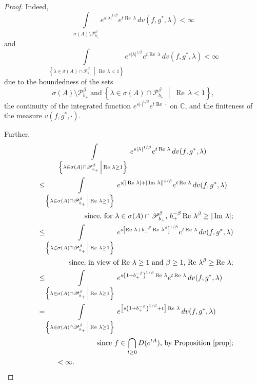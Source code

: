 \documentclass{amsart}
\theoremstyle{plain}
\theoremstyle{definition}
\begin{document}
\begin{proof}
Indeed, 
\[
\int\limits_{\sigma(A)\setminus{\mathscr P}_{b_+}^\beta}e^{s|\lambda|^{1/\beta}}e^{t\operatorname{Re\,}\lambda}\,dv(f,g^*,\lambda)<\infty
\]
and
\[
\int\limits_{\left\{\lambda\in \sigma(A)\cap{\mathscr P}_{b_+}^\beta\,\middle|\,\operatorname{Re\,}\lambda<1 \right\}}e^{s|\lambda|^{1/\beta}}e^{t\operatorname{Re\,}\lambda}\,dv(f,g^*,\lambda)<\infty
\]
due to the boundedness of the sets
\[
\sigma(A)\setminus{\mathscr P}_{b_+}^\beta\ \text{and}\
\left\{\lambda\in \sigma(A)\cap{\mathscr P}_{b_+}^\beta\;\middle|\;\operatorname{Re\,}\lambda<1 \right\},
\]
the continuity of the integrated function 
$e^{s|\cdot|^{1/\beta}}e^{t\operatorname{Re\,}\cdot}$
on ${{\mathbb C}}$, and the finiteness of the measure $v(f,g^*,\cdot)$.

Further,
\begin{multline}\label{interm}
\int\limits_{\left\{\lambda\in \sigma(A)\cap{\mathscr P}_{b_+}^\beta\,\middle|\,\operatorname{Re\,}\lambda\ge 1 \right\}}e^{s|\lambda|^{1/\beta}}e^{t\operatorname{Re\,}\lambda}\,dv(f,g^*,\lambda)
\\
\shoveleft{
\le\int\limits_{\left\{\lambda\in \sigma(A)\cap{\mathscr P}_{b_+}^\beta\,\middle|\,\operatorname{Re\,}\lambda\ge 1 \right\}}e^{s\left[|\operatorname{Re\,}\lambda|+|\operatorname{Im\,}\lambda|\right]^{1/\beta}}e^{t\operatorname{Re\,}\lambda}\,dv(f,g^*,\lambda)
}\\
\hfill
\text{since, for $\lambda\in\sigma(A)\cap{\mathscr P}_{b_+}^\beta$, $b_+^{-\beta}\operatorname{Re\,}\lambda^\beta\ge |\operatorname{Im\,}\lambda|$;}
\\
\shoveleft{
\le 
\int\limits_{\left\{\lambda\in \sigma(A)\cap{\mathscr P}_{b_+}^\beta\,\middle|\,\operatorname{Re\,}\lambda\ge 1 \right\}}e^{s\left[\operatorname{Re\,}\lambda+b_+^{-\beta}\operatorname{Re\,}\lambda^\beta\right]^{1/\beta}}e^{t\operatorname{Re\,}\lambda}\,dv(f,g^*,\lambda)
}\\
\hfill
\text{since, in view of $\operatorname{Re\,}\lambda\ge 1$ and $\beta\ge 1$, $\operatorname{Re\,}\lambda^\beta\ge\operatorname{Re\,}\lambda$;}
\\
\shoveleft{
\le 
\int\limits_{\left\{\lambda\in \sigma(A)\cap{\mathscr P}_{b_+}^\beta\,\middle|\,\operatorname{Re\,}\lambda\ge 1 \right\}}e^{s\left(1+b_+^{-\beta}\right)^{1/\beta}\operatorname{Re\,}\lambda}e^{t\operatorname{Re\,}\lambda}\,dv(f,g^*,\lambda)
}\\
\shoveleft{
= \int\limits_{\left\{\lambda\in \sigma(A)\cap{\mathscr P}_{b_+}^\beta\,\middle|\,\operatorname{Re\,}\lambda\ge 1 \right\}}e^{\left[s\left(1+b_+^{-\beta}\right)^{1/\beta}+t\right]\operatorname{Re\,}\lambda}\,dv(f,g^*,\lambda)
}\\
\hfill
\text{since $f\in \bigcap\limits_{t\ge 0}D(e^{tA})$, by Proposition \ref{prop};}
\\
\hspace{1.2cm}
<\infty. 
\hfill
\end{multline}


\end{proof}
\end{document}
